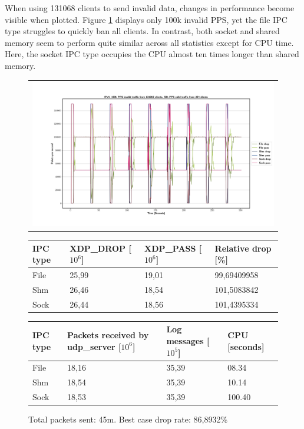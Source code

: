 When using 131068 clients to send invalid data, changes in performance become visible when plotted.
Figure \ref{fig:data:ipv4:100k:131068} displays only 100k invalid PPS, yet the file IPC type struggles to quickly ban all clients.
In contrast, both socket and shared memory seem to perform quite similar across all statistics except for CPU time.
Here, the socket IPC type occupies the CPU almost ten times longer than shared memory.

\begin{figure}[!h]
	\centering
	\scriptsize
	\begin{tabular}{c}
    	\centerline{\includegraphics[width=1.2\textwidth]{images/IPv4_100k_131068_1.png}}
	\end{tabular}
	\begin{tabular}{llll}
		\toprule
		\textbf{IPC type} & \textbf{XDP\_DROP [$10^6$]} & \textbf{XDP\_PASS [$10^6$]} & \textbf{Relative drop [\%]} \\ \midrule 
		File & 25,99 & 19,01 & 99,69409958 \\
        Shm & 26,46 & 18,54 & 101,5083842 \\
        Sock & 26,44 & 18,56 & 101,4395334 \\
	\bottomrule
	\end{tabular}
    \begin{tabular}{llll}
		\toprule
		\textbf{IPC type} & \textbf{Packets received by udp\_server [$10^6$]} & \textbf{Log messages [$10^5$]} & \textbf{CPU [seconds]} \\ \midrule 
		File & 18,16 & 35,39 & 08.34 \\
        Shm & 18,54 & 35,39 & 10.14 \\
        Sock & 18,53 & 35,39 & 100.40 \\
	\bottomrule
	\end{tabular}
	\caption[Simplefail2ban, IPv4, 100k \ac{PPS}, 131068 malicious clients]{Total packets sent: 45m. Best case drop rate: 86,8932\%}
	\label{fig:data:ipv4:100k:131068}
\end{figure}

